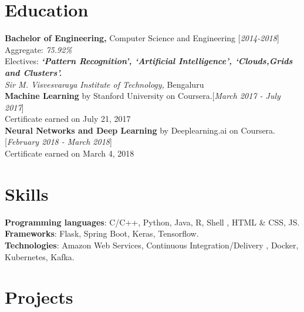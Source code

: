 \documentclass[10pt]{article}
\renewcommand{\textbf}[1]{{\bfseries\color{accent_darkest}#1}}
\begin{document}
\section*{Education} \textbf{Bachelor of Engineering,} Computer Science
and Engineering \hfill \textcolor{grey_darker}{[\textit{2014-2018}]}\\
Aggregate: \textit{75.92\%}\\
Electives: \textbf{\textit{`Pattern Recognition', `Artificial Intelligence',
`Clouds,Grids and Clusters'.}}\\
\textit{Sir M. Visvesvaraya Institute of Technology,} Bengaluru
\medskip
\\
\textbf{Machine Learning} by Stanford University on Coursera.\hfill  \textcolor{grey_darker}{[\textit
{March 2017 - July 2017}]}\\
Certificate earned on July 21, 2017
\medskip\\ 
\textbf{Neural Networks and Deep Learning} by Deeplearning.ai on Coursera.\hfill  \textcolor{grey_darker}{[\textit
{February 2018 - March 2018}]}\\
Certificate earned on March 4, 2018 

\section*{Skills} 
\textbf{Programming languages}: C/C++, Python, Java, R, Shell , HTML \& CSS, JS.\\
\textbf{Frameworks}: Flask, Spring Boot, Keras, Tensorflow.\\
\textbf{Technologies}: Amazon Web Services, Continuous Integration/Delivery , Docker, Kubernetes, Kafka. 

\section*{Projects}
\end{document}
